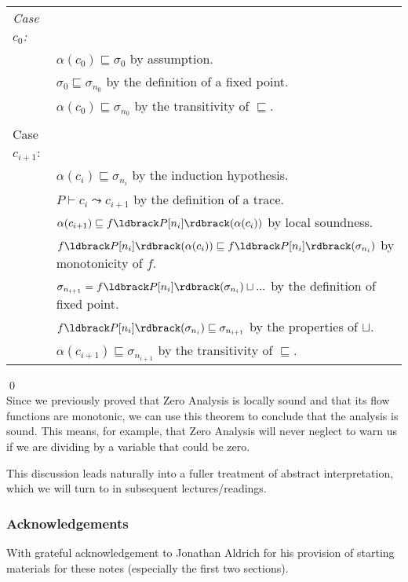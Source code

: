 \documentclass[11pt]{article}
\newcommand{\parg}[1] %
  {\ldbrack #1 \rdbrack}
\newcommand{\join}{\sqcup}
\newcommand{\alap}{\sqsubseteq}
\begin{document}
\begin{tabular}{ll}
\emph{Case $c_0$:} & \\
& $\alpha(c_0) \alap \sigma_0$ by assumption. \\
& $\sigma_0 \alap \sigma_{n_0}$ by the definition of a fixed point. \\
& $\alpha(c_0) \alap \sigma_{n_0}$ by the transitivity of $\alap$.\\

\\

Case $c_{i+1}$: & \\
& $\alpha(c_i) \alap \sigma_{n_i}$ by the induction hypothesis. \\
& $P \vdash c_i \leadsto c_{i+1}$ by the definition of a trace. \\
& $\alpha(c_{i+1}) \alap f\parg{P[n_i]}(\alpha(c_i))$ by local soundness. \\
& $f\parg{P[n_i]}(\alpha(c_i)) \alap f\parg{P[n_i]}(\sigma_{n_i})$ by monotonicity of $f$. \\
& $\sigma_{n_{i+1}} = f\parg{P[n_i]}(\sigma_{n_i}) \join ...$ by the definition of fixed point. \\
& $f\parg{P[n_i]}(\sigma_{n_i}) \alap \sigma_{n_{i+1}}$ by the properties of $\join$. \\
& $\alpha(c_{i+1}) \alap \sigma_{n_{i+1}}$ by the transitivity of $\alap$. \\
\end{tabular}

\qed\\[1ex]

Since we previously proved that Zero Analysis is locally sound and that its flow functions are monotonic, we can use this theorem to conclude that the analysis is sound.  This means, for example, that Zero Analysis will never neglect to warn us if we are dividing by a variable that could be zero.

\vspace{1ex}

This discussion leads naturally into a fuller treatment of abstract interpretation, which we will turn to in subsequent lectures/readings.

\subsubsection*{Acknowledgements}

With grateful acknowledgement to Jonathan Aldrich for his provision of starting
materials for these notes (especially the first two sections). 
\end{document}
